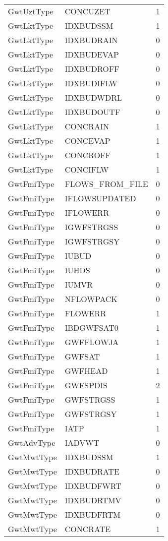\begin{longtable}{p{6cm} p{4cm} p{2cm} }
GwtUztType &  CONCUZET & 1 \\ 
GwtLktType &  IDXBUDSSM & 1 \\ 
GwtLktType &  IDXBUDRAIN & 0 \\ 
GwtLktType &  IDXBUDEVAP & 0 \\ 
GwtLktType &  IDXBUDROFF & 0 \\ 
GwtLktType &  IDXBUDIFLW & 0 \\ 
GwtLktType &  IDXBUDWDRL & 0 \\ 
GwtLktType &  IDXBUDOUTF & 0 \\ 
GwtLktType &  CONCRAIN & 1 \\ 
GwtLktType &  CONCEVAP & 1 \\ 
GwtLktType &  CONCROFF & 1 \\ 
GwtLktType &  CONCIFLW & 1 \\ 
GwtFmiType &  FLOWS\_FROM\_FILE & 0 \\ 
GwtFmiType &  IFLOWSUPDATED & 0 \\ 
GwtFmiType &  IFLOWERR & 0 \\ 
GwtFmiType &  IGWFSTRGSS & 0 \\ 
GwtFmiType &  IGWFSTRGSY & 0 \\ 
GwtFmiType &  IUBUD & 0 \\ 
GwtFmiType &  IUHDS & 0 \\ 
GwtFmiType &  IUMVR & 0 \\ 
GwtFmiType &  NFLOWPACK & 0 \\ 
GwtFmiType &  FLOWERR & 1 \\ 
GwtFmiType &  IBDGWFSAT0 & 1 \\ 
GwtFmiType &  GWFFLOWJA & 1 \\ 
GwtFmiType &  GWFSAT & 1 \\ 
GwtFmiType &  GWFHEAD & 1 \\ 
GwtFmiType &  GWFSPDIS & 2 \\ 
GwtFmiType &  GWFSTRGSS & 1 \\ 
GwtFmiType &  GWFSTRGSY & 1 \\ 
GwtFmiType &  IATP & 1 \\ 
GwtAdvType &  IADVWT & 0 \\ 
GwtMwtType &  IDXBUDSSM & 1 \\ 
GwtMwtType &  IDXBUDRATE & 0 \\ 
GwtMwtType &  IDXBUDFWRT & 0 \\ 
GwtMwtType &  IDXBUDRTMV & 0 \\ 
GwtMwtType &  IDXBUDFRTM & 0 \\ 
GwtMwtType &  CONCRATE & 1 \\ 

\end{longtable}
